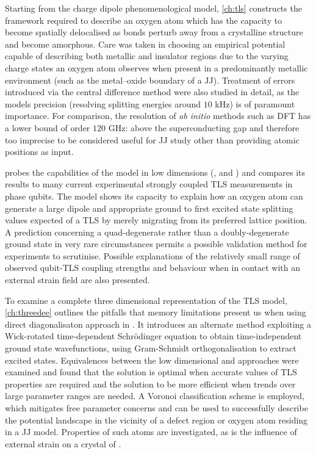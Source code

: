 Starting from the charge dipole phenomenological model, \cref{ch:tls} constructs the framework required to describe an oxygen atom which has the capacity to become spatially delocalised as bonds perturb away from a crystalline structure and become amorphous.
Care was taken in choosing an empirical potential capable of describing both metallic and insulator regions due to the varying charge states an oxygen atom observes when present in a predominantly metallic environment (such as the metal--oxide boundary of a JJ).
Treatment of errors introduced via the central difference method were also studied in detail, as the models precision (resolving splitting energies around $10$ kHz) is of paramount importance.
For comparison, the resolution of \textit{ab initio} methods such as DFT has a lower bound of order $120$ GHz: above the superconducting gap and therefore too imprecise to be considered useful for JJ study other than providing atomic positions as input.

 probes the capabilities of the model in low dimensions (,  and ) and compares its results to many current experimental strongly coupled TLS measurements in phase qubits.
The model shows its capacity to explain how an oxygen atom can generate a large dipole and appropriate ground to first excited state splitting values expected of a TLS by merely migrating from its preferred lattice position.
A prediction concerning a quad-degenerate rather than a doubly-degenerate ground state in very rare circumstances permits a possible validation method for experiments to scrutinise.
Possible explanations of the relatively small range of observed qubit-TLS coupling strengths and behaviour when in contact with an external strain field are also presented.

To examine a complete three dimensional representation of the TLS model, \cref{ch:threedee} outlines the pitfalls that memory limitations present us when using direct diagonalisaton approach in . 
It introduces an alternate method exploiting a Wick-rotated time-dependent Schrödinger equation to obtain time-independent ground state wavefunctions, using Gram-Schmidt orthogonalisation to extract excited states.
Equivalences between the low dimensional and  approaches were examined and found that the  solution is optimal when accurate values of TLS properties are required and the  solution to be more efficient when trends over large parameter ranges are needed.
A Voronoi classification scheme is employed, which mitigates free parameter concerns and can be used to successfully describe the potential landscape in the vicinity of a defect region or oxygen atom residing in a JJ model.
Properties of such atoms are investigated, as is the influence of external strain on a crystal of .

